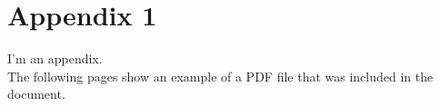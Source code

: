 

\section*{Appendix 1}

I'm an appendix.\\
The following pages show an example of a PDF file that was included in the document.

\newpage
{}

